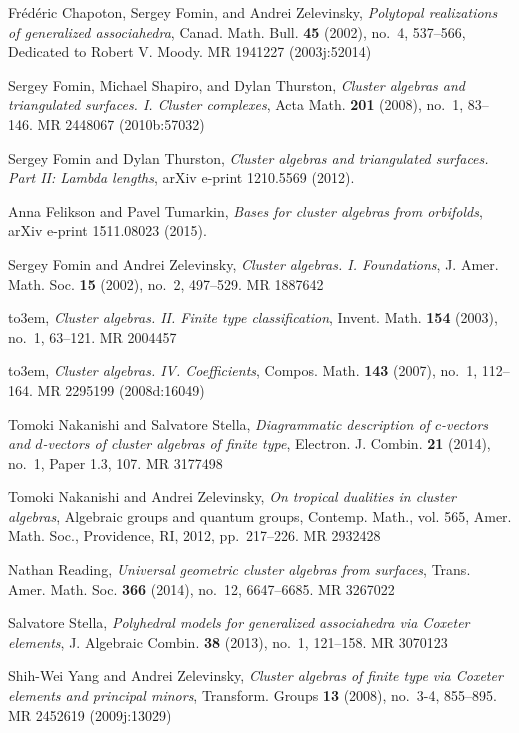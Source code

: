 \documentclass[11pt]{amsart}
\theoremstyle{definition}
\numberwithin{equation}{section}
\numberwithin{figure}{section}
\begin{document}
\providecommand{\bysame}{\leavevmode\hbox to3em{\hrulefill}\thinspace}
\providecommand{\MR}{\relax\ifhmode\unskip\space\fi MR }
\providecommand{\MRhref}[2]{%
  \href{http://www.ams.org/mathscinet-getitem?mr=#1}{#2}
}
\providecommand{\href}[2]{#2}
\begin{thebibliography}{CFZ02}

Fr{\'e}d{\'e}ric Chapoton, Sergey Fomin, and Andrei Zelevinsky, \emph{Polytopal
  realizations of generalized associahedra}, Canad. Math. Bull. \textbf{45}
  (2002), no.~4, 537--566, Dedicated to Robert V. Moody. \MR{1941227
  (2003j:52014)}

Sergey Fomin, Michael Shapiro, and Dylan Thurston, \emph{Cluster algebras and
  triangulated surfaces. {I}. {C}luster complexes}, Acta Math. \textbf{201}
  (2008), no.~1, 83--146. \MR{2448067 (2010b:57032)}

Sergey Fomin and Dylan Thurston, \emph{{Cluster algebras and triangulated
  surfaces. Part II: Lambda lengths}}, arXiv e-print 1210.5569 (2012).

Anna {Felikson} and Pavel {Tumarkin}, \emph{{Bases for cluster algebras from
  orbifolds}}, arXiv e-print 1511.08023 (2015).

Sergey Fomin and Andrei Zelevinsky, \emph{Cluster algebras. {I}.
  {F}oundations}, J. Amer. Math. Soc. \textbf{15} (2002), no.~2, 497--529.
  \MR{1887642}

\bysame, \emph{Cluster algebras. {II}. {F}inite type classification}, Invent.
  Math. \textbf{154} (2003), no.~1, 63--121. \MR{2004457}

\bysame, \emph{Cluster algebras. {IV}. {C}oefficients}, Compos. Math.
  \textbf{143} (2007), no.~1, 112--164. \MR{2295199 (2008d:16049)}

Tomoki Nakanishi and Salvatore Stella, \emph{Diagrammatic description of
  {$c$}-vectors and {$d$}-vectors of cluster algebras of finite type},
  Electron. J. Combin. \textbf{21} (2014), no.~1, Paper 1.3, 107. \MR{3177498}

Tomoki Nakanishi and Andrei Zelevinsky, \emph{On tropical dualities in cluster
  algebras}, Algebraic groups and quantum groups, Contemp. Math., vol. 565,
  Amer. Math. Soc., Providence, RI, 2012, pp.~217--226. \MR{2932428}

Nathan Reading, \emph{Universal geometric cluster algebras from surfaces},
  Trans. Amer. Math. Soc. \textbf{366} (2014), no.~12, 6647--6685. \MR{3267022}

Salvatore Stella, \emph{Polyhedral models for generalized associahedra via
  {C}oxeter elements}, J. Algebraic Combin. \textbf{38} (2013), no.~1,
  121--158. \MR{3070123}

Shih-Wei Yang and Andrei Zelevinsky, \emph{Cluster algebras of finite type via
  {C}oxeter elements and principal minors}, Transform. Groups \textbf{13}
  (2008), no.~3-4, 855--895. \MR{2452619 (2009j:13029)}

\end{thebibliography}
\end{document}
